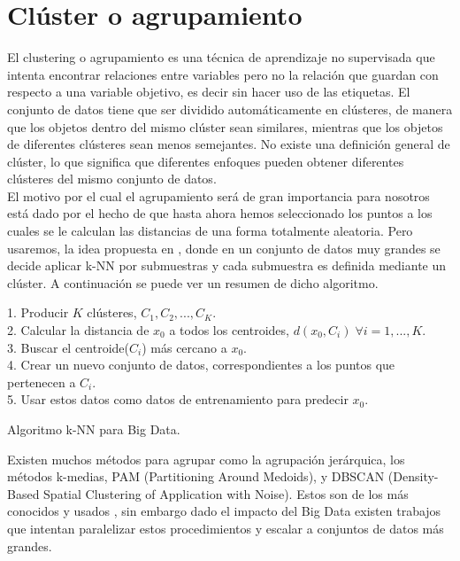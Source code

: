 \documentclass[12pt]{report} %
\theoremstyle{definition}
\begin{document}
{\section{Clúster o agrupamiento}

El clustering o agrupamiento es una técnica de aprendizaje no supervisada que intenta encontrar relaciones entre variables pero no la relación que guardan con respecto a una variable objetivo, es decir sin hacer uso de las etiquetas. El conjunto de datos tiene que ser dividido automáticamente en clústeres, de manera que los objetos dentro del mismo clúster sean similares, mientras que los objetos de diferentes clústeres sean menos semejantes. No existe una definición general de clúster, lo que significa que diferentes enfoques pueden obtener diferentes clústeres del mismo conjunto de datos.\\

El motivo por el cual el agrupamiento será de gran importancia para nosotros está dado por el hecho de que hasta ahora hemos seleccionado los puntos a los cuales se le calculan las distancias de una forma totalmente aleatoria. Pero usaremos, la idea propuesta en \cite{EfficientkNN}, donde en un conjunto de datos muy grandes se decide aplicar k-NN por submuestras y cada submuestra es definida mediante un clúster. A continuación se puede ver un resumen de dicho algoritmo.\\

\begin{algorithm}[H] \label{algoritmo knn eficiente}
	\SetAlgoLined
	1. Producir $K$ clústeres, $C_1,C_2,...,C_K$. \\
	2. Calcular la distancia de $x_0$ a todos los centroides, $d(x_0,C_i) \; \forall i=1,...,K$. \\
	3. Buscar el centroide($C_i$) más cercano a $x_0$. \\
	4. Crear un nuevo conjunto de datos, correspondientes a los puntos que pertenecen a $C_i$.\\
	5. Usar estos datos como datos de entrenamiento para predecir $x_0$.
	\caption{Algoritmo k-NN para Big Data.}
\end{algorithm}
\vspace{0.5cm}

Existen muchos métodos para agrupar como la agrupación jerárquica, los métodos k-medias, PAM (Partitioning Around Medoids), y DBSCAN (Density-Based Spatial Clustering of Application with Noise). Estos son de los más conocidos y usados \cite{listacluster}, sin embargo dado el impacto del Big Data existen trabajos que intentan paralelizar estos procedimientos y escalar a conjuntos de datos más grandes.

}
\end{document}
